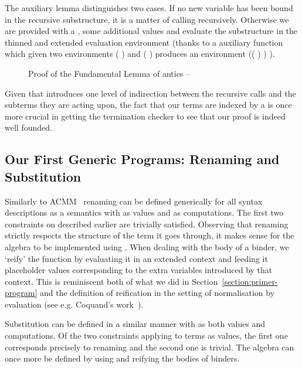 The auxiliary lemma  distinguishes two cases. If no new
variable has been bound in the recursive substructure, it is
a matter of calling  recursively. Otherwise we are provided
with a , some additional values and evaluate the
substructure in the thinned and extended evaluation environment
(thanks to a auxiliary function \AF{\_>>\_} which given two environments
{( )  } and {( )  }
produces an environment {(( \AF{++} ) )  )}.

\begin{figure}[h]
\caption{Proof of the Fundamental Lemma of antics -- }\label{def:body}
\end{figure}

Given that  introduces one level of indirection between the
recursive calls and the subterms they are acting upon, the fact
that our terms are indexed by a  is once more crucial in
getting the termination checker to see that our proof is indeed
well founded.

\subsection{Our First Generic Programs: Renaming and Substitution}\label{section:renandsub}

Similarly to ACMM~\citeyear{allais2017type} renaming can be defined generically
for all syntax descriptions as a semantics with  as values and  as
computations. The first two constraints on  described earlier are trivially
satisfied. Observing that renaming strictly respects the structure of the term it
goes through, it makes sense for the algebra to be implemented using .
When dealing with the body of a binder, we `reify' the  function by
evaluating it in an extended context and feeding it placeholder values corresponding to
the extra variables introduced by that context. This is reminiscent both of what we
did in Section~\ref{section:primer-program} and the definition of reification in
the setting of normalisation by evaluation (see e.g. Coquand's work~\citeyear{coquand2002formalised}).

Substitution can be defined in a similar manner with  as both
values and computations. Of the two constraints applying to terms as
values, the first one corresponds precisely to renaming and the second
one is trivial. The algebra can once more be defined by using 
and reifying the bodies of binders.

